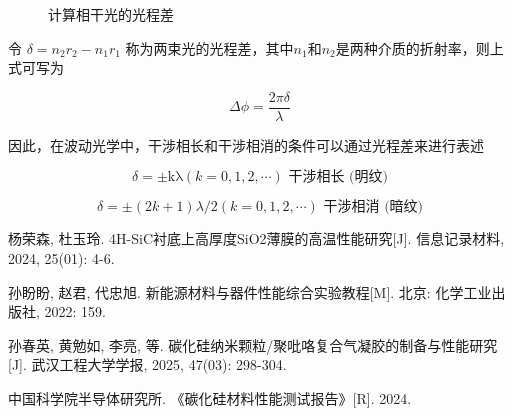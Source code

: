 \documentclass[withoutpreface,bwprint]{cumcmthesis} %
\begin{document}
\begin{appendices}
\begin{figure}[ht]
        \caption{计算相干光的光程差}
        \label{fig:3}
    \end{figure}
    令 $\delta = n_2 r_2 - n_1 r_1$ 称为两束光的光程差，其中$n_1$和$n_2$是两种介质的折射率，则上式可写为


    \[\Delta\phi = \frac{2 \pi\delta }{\lambda}\]


    因此，在波动光学中，干涉相长和干涉相消的条件可以通过光程差来进行表述

    \[\delta = \pm \text{kλ}(k = 0,1,2,\cdots)\text{~}\text{干涉相长}\text{\ (}\text{明纹}\text{)}\]

    \[\delta = \pm (2k + 1)\lambda/2(k = 0,1,2,\cdots)\text{~}\text{干涉相消}\text{\ (}\text{暗纹}\text{)}\]


\end{appendices}
\begin{thebibliography}{9}

    杨荣森, 杜玉玲. 4H-SiC衬底上高厚度SiO2薄膜的高温性能研究[J]. 信息记录材料, 2024, 25(01): 4-6.

    孙盼盼, 赵君, 代忠旭. 新能源材料与器件性能综合实验教程[M]. 北京: 化学工业出版社, 2022: 159.

    孙春英, 黄勉如, 李亮, 等. 碳化硅纳米颗粒/聚吡咯复合气凝胶的制备与性能研究[J]. 武汉工程大学学报, 2025, 47(03): 298-304.

    中国科学院半导体研究所. 《碳化硅材料性能测试报告》[R]. 2024.

\end{thebibliography}
\end{document}
